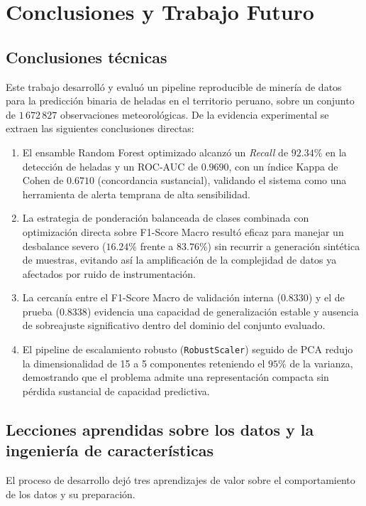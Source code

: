 \section{Conclusiones y Trabajo Futuro}\label{sec:conclusions}

\subsection{Conclusiones técnicas}
Este trabajo desarrolló y evaluó un pipeline reproducible de minería de datos
para la predicción binaria de heladas en el territorio peruano, sobre un conjunto
de $1\,672\,827$ observaciones meteorológicas. De la evidencia experimental se
extraen las siguientes conclusiones directas:

\begin{enumerate}
\item El ensamble Random Forest optimizado alcanzó un \emph{Recall} de $92.34\%$
en la detección de heladas y un ROC-AUC de $0.9690$, con un índice Kappa de Cohen
de $0.6710$ (concordancia sustancial), validando el sistema como una herramienta
de alerta temprana de alta sensibilidad.
\item La estrategia de ponderación balanceada de clases combinada con
optimización directa sobre F1-Score Macro resultó eficaz para manejar un
desbalance severo ($16.24\%$ frente a $83.76\%$) sin recurrir a generación
sintética de muestras, evitando así la amplificación de la complejidad de datos
ya afectados por ruido de instrumentación.
\item La cercanía entre el F1-Score Macro de validación interna ($0.8330$) y el de
prueba ($0.8338$) evidencia una capacidad de generalización estable y ausencia de
sobreajuste significativo dentro del dominio del conjunto evaluado.
\item El pipeline de escalamiento robusto (\texttt{RobustScaler}) seguido de PCA
redujo la dimensionalidad de 15 a 5 componentes reteniendo el $95\%$ de la
varianza, demostrando que el problema admite una representación compacta sin
pérdida sustancial de capacidad predictiva.
\end{enumerate}

\subsection{Lecciones aprendidas sobre los datos y la ingeniería de características}
El proceso de desarrollo dejó tres aprendizajes de valor sobre el comportamiento
de los datos y su preparación.

